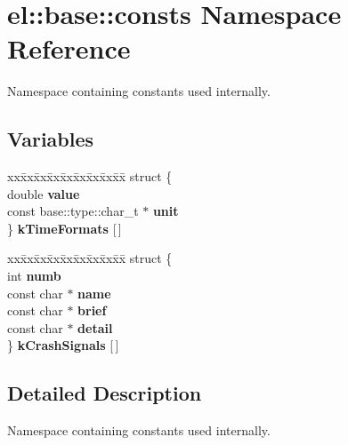 \hypertarget{namespaceel_1_1base_1_1consts}{\section{el\-:\-:base\-:\-:consts Namespace Reference}
\label{namespaceel_1_1base_1_1consts}
}


Namespace containing constants used internally.  


\subsection*{Variables}
\begin{DoxyCompactItemize}
\item 
\begin{tabbing}
xx\=xx\=xx\=xx\=xx\=xx\=xx\=xx\=xx\=\kill
struct \{\\
\>double {\bfseries value}\\
\>const base::type::char\_t $\ast$ {\bfseries unit}\\
\} {\bfseries kTimeFormats} \mbox{[}$\,$\mbox{]}\\

\end{tabbing}\item 
\begin{tabbing}
xx\=xx\=xx\=xx\=xx\=xx\=xx\=xx\=xx\=\kill
struct \{\\
\>int {\bfseries numb}\\
\>const char $\ast$ {\bfseries name}\\
\>const char $\ast$ {\bfseries brief}\\
\>const char $\ast$ {\bfseries detail}\\
\} {\bfseries kCrashSignals} \mbox{[}$\,$\mbox{]}\\

\end{tabbing}\end{DoxyCompactItemize}


\subsection{Detailed Description}
Namespace containing constants used internally. 

